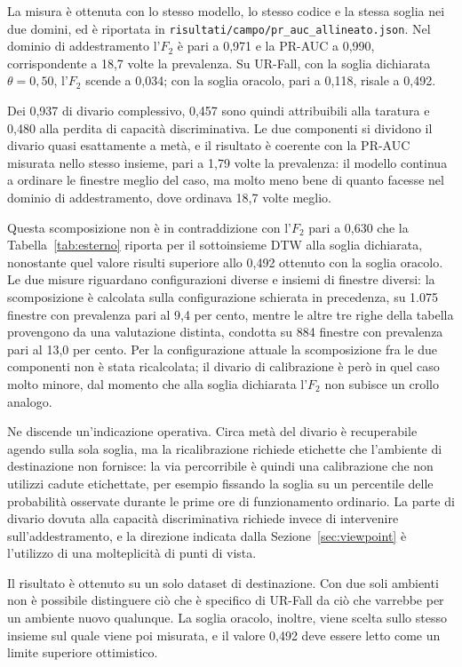 La misura è ottenuta con lo stesso modello, lo stesso codice e la stessa soglia nei due domini, ed è riportata in \texttt{risultati/campo/pr\_auc\_allineato.json}. Nel dominio di addestramento l'$F_2$ è pari a 0,971 e la PR-AUC a 0,990, corrispondente a 18,7 volte la prevalenza. Su UR-Fall, con la soglia dichiarata $\theta = 0{,}50$, l'$F_2$ scende a 0,034; con la soglia oracolo, pari a 0,118, risale a 0,492.

Dei 0,937 di divario complessivo, 0,457 sono quindi attribuibili alla taratura e 0,480 alla perdita di capacità discriminativa. Le due componenti si dividono il divario quasi esattamente a metà, e il risultato è coerente con la PR-AUC misurata nello stesso insieme, pari a 1,79 volte la prevalenza: il modello continua a ordinare le finestre meglio del caso, ma molto meno bene di quanto facesse nel dominio di addestramento, dove ordinava 18,7 volte meglio.

Questa scomposizione non è in contraddizione con l'$F_2$ pari a 0,630 che la Tabella~\ref{tab:esterno} riporta per il sottoinsieme DTW alla soglia dichiarata, nonostante quel valore risulti superiore allo 0,492 ottenuto con la soglia oracolo. Le due misure riguardano configurazioni diverse e insiemi di finestre diversi: la scomposizione è calcolata sulla configurazione schierata in precedenza, su 1.075 finestre con prevalenza pari al 9,4 per cento, mentre le altre tre righe della tabella provengono da una valutazione distinta, condotta su 884 finestre con prevalenza pari al 13,0 per cento. Per la configurazione attuale la scomposizione fra le due componenti non è stata ricalcolata; il divario di calibrazione è però in quel caso molto minore, dal momento che alla soglia dichiarata l'$F_2$ non subisce un crollo analogo.

Ne discende un'indicazione operativa. Circa metà del divario è recuperabile agendo sulla sola soglia, ma la ricalibrazione richiede etichette che l'ambiente di destinazione non fornisce: la via percorribile è quindi una calibrazione che non utilizzi cadute etichettate, per esempio fissando la soglia su un percentile delle probabilità osservate durante le prime ore di funzionamento ordinario. La parte di divario dovuta alla capacità discriminativa richiede invece di intervenire sull'addestramento, e la direzione indicata dalla Sezione~\ref{sec:viewpoint} è l'utilizzo di una molteplicità di punti di vista.

Il risultato è ottenuto su un solo dataset di destinazione. Con due soli ambienti non è possibile distinguere ciò che è specifico di UR-Fall da ciò che varrebbe per un ambiente nuovo qualunque. La soglia oracolo, inoltre, viene scelta sullo stesso insieme sul quale viene poi misurata, e il valore 0,492 deve essere letto come un limite superiore ottimistico.

